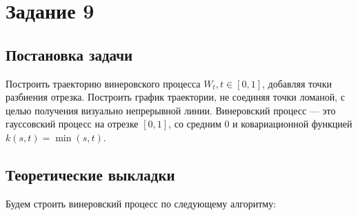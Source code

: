\documentclass[11pt]{article}
\begin{document}
\section{Задание 9}
\subsection{Постановка задачи}
Построить траекторию винеровского процесса $W_t, t \in [0, 1]$, добавляя точки разбиения отрезка. Построить график траектории, не соединяя точки ломаной, с целью получения визуально непрерывной линии. Винеровский процесс --- это гауссовский процесс на отрезке $[0, 1]$, со средним $0$ и ковариационной функцией $k(s, t) = \min(s, t)$.
\subsection{Теоретические выкладки}
Будем строить винеровский процесс по следующему алгоритму:
\end{document}
